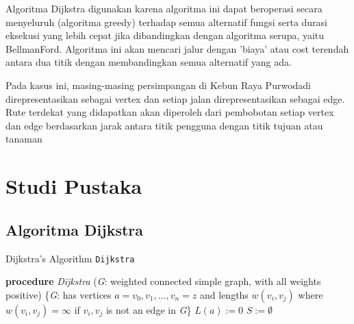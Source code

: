\documentclass[conference]{IEEEtran}
\begin{document}
Algoritma Dijkstra digunakan karena algoritma ini dapat
beroperasi secara menyeluruh (algoritma greedy) terhadap
semua alternatif fungsi serta durasi eksekusi yang lebih cepat
jika dibandingkan dengan algoritma serupa, yaitu BellmanFord. Algoritma ini akan mencari jalur dengan ’biaya’ atau
cost terendah antara dua titik dengan membandingkan semua
alternatif yang ada.

Pada kasus ini, masing-masing persimpangan di Kebun
Raya Purwodadi direpresentasikan sebagai vertex dan setiap
jalan direpresentasikan sebagai edge. Rute terdekat yang didapatkan akan diperoleh dari pembobotan setiap vertex dan edge
berdasarkan jarak antara titik pengguna dengan titik tujuan
atau tanaman

\section{Studi Pustaka}
\subsection{Algoritma Dijkstra}
\begin{algorithm}
    \caption{Dijkstra's Algorithm \texttt{Dijkstra}}\label{alg:one}
    \DontPrintSemicolon
    \textbf{procedure}
    \emph{Dijkstra} (\emph{G}: weighted connected simple
    graph, with all weights positive)\;
    \{\emph{G}: has vertices $ a = v_0,v_1,...,v_n = z  $ and lengths $w(v_i,v_j)$ 
    where $w(v_i,v_j)=\infty$ if $v_i,v_j$ is not an edge in \emph{G}\}\;
    $L(a) := 0$\;
    $S:=\emptyset$

\end{algorithm}
\end{document}
